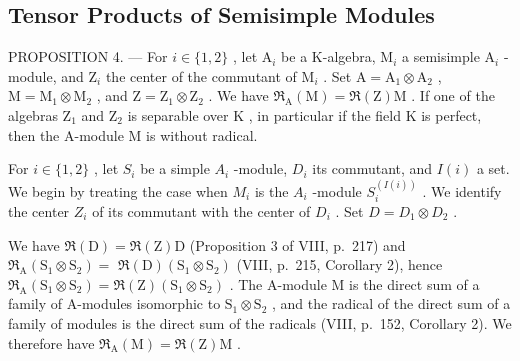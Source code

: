 \subsection{Tensor Products of Semisimple Modules}

PROPOSITION 4. --- For \(i \in \{1,2\}\) , let \(\mathrm{A}_i\) be a K-algebra, \(\mathrm{M}_i\) a semisimple \(\mathrm{A}_i\) -module, and \(\mathrm{Z}_i\) the center of the commutant of \(\mathrm{M}_i\) . Set \(\mathrm{A} = \mathrm{A}_1 \otimes \mathrm{A}_2\) , \(\mathrm{M} = \mathrm{M}_1 \otimes \mathrm{M}_2\) , and \(\mathrm{Z} = \mathrm{Z}_1 \otimes \mathrm{Z}_2\) . We have \(\Re_{\mathrm{A}}(\mathrm{M}) = \Re(\mathrm{Z})\mathrm{M}\) . If one of the algebras \(\mathrm{Z}_1\) and \(\mathrm{Z}_2\) is separable over \(\mathrm{K}\) , in particular if the field \(\mathrm{K}\) is perfect, then the A-module \(\mathrm{M}\) is without radical.

For \(i \in \{1,2\}\) , let \(S_i\) be a simple \(A_i\) -module, \(D_i\) its commutant, and \(I(i)\) a set. We begin by treating the case when \(M_i\) is the \(A_i\) -module \(S_i^{(I(i))}\) . We identify the center \(Z_i\) of its commutant with the center of \(D_i\) . Set \(D = D_1 \otimes D_2\) .

We have \(\Re (\mathrm{D}) = \Re (\mathrm{Z})\mathrm{D}\) (Proposition 3 of VIII, p.~217) and \(\Re_{\mathrm{A}}(\mathrm{S}_1\otimes \mathrm{S}_2) =\) \(\Re (\mathrm{D})(\mathrm{S}_1\otimes \mathrm{S}_2)\) (VIII, p.~215, Corollary 2), hence \(\Re_{\mathrm{A}}(\mathrm{S}_1\otimes \mathrm{S}_2) = \Re (\mathrm{Z})(\mathrm{S}_1\otimes \mathrm{S}_2)\) . The A-module M is the direct sum of a family of A-modules isomorphic to \(\mathrm{S}_1\otimes \mathrm{S}_2\) , and the radical of the direct sum of a family of modules is the direct sum of the radicals (VIII, p.~152, Corollary 2). We therefore have \(\Re_{\mathrm{A}}(\mathrm{M}) = \Re (\mathrm{Z})\mathrm{M}\) .

